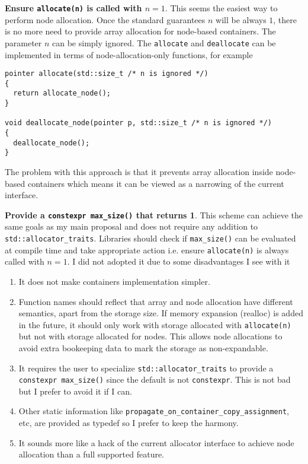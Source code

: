 \documentclass[11pt]{article}
\begin{document}
\medskip
\noindent
{\bf Ensure \texttt{allocate(n)} is called with $n = 1$}. This seems the easiest
way to perform node allocation. Once the standard guarantees $n$ will be always $1$,
there is no more need to provide array allocation for node-based containers. The
parameter $n$ can be simply ignored. The \texttt{allocate} and \texttt{deallocate}
can be implemented in terms of node-allocation-only functions, for example
\medskip
\begin{lstlisting}
pointer allocate(std::size_t /* n is ignored */)
{
  return allocate_node();
}

void deallocate_node(pointer p, std::size_t /* n is ignored */)
{
  deallocate_node();
}
\end{lstlisting}

The problem with this approach is that it prevents array allocation inside
node-based containers which means it can be viewed as a narrowing of the
current interface.

\medskip
\noindent
{\bf Provide a \texttt{constexpr max\_size()} that returns 1}. This scheme
can achieve the same goals as my main proposal and does not require any
addition to \texttt{std::allocator\_traits}. Libraries should check if
\texttt{max\_size()} can be evaluated at compile time and take appropriate
action i.e. ensure \texttt{allocate(n)} is always called with $n = 1$.
I did not adopted it due to some disadvantages I see with it

\begin{enumerate}
\item It does not make containers implementation simpler.

\item Function names should reflect that array and node allocation have
different semantics, apart from the storage size. If memory expansion (realloc)
is added in the future, it should only work with storage allocated with
\texttt{allocate(n)} but not with storage allocated for nodes. This allows node
allocations to avoid extra bookeeping data to mark the storage as
non-expandable.

\item It requires the user to specialize \texttt{std::allocator\_traits} to
provide a \texttt{constexpr max\_size()} since the default is not
\texttt{constexpr}. This is not bad but I prefer to avoid it if I can.

\item Other static information like \texttt{propagate\_on\_container\_copy\_assignment}, etc,
are provided as typedef so I prefer to keep the harmony.

\item It sounds more like a hack of the current allocator interface to achieve
node allocation than a full supported feature.

\end{enumerate}
\end{document}
